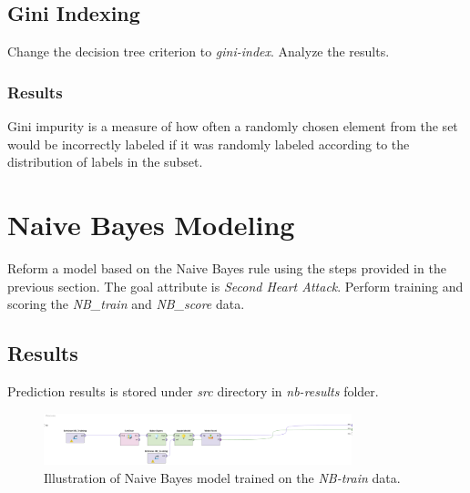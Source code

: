 \documentclass[12pt]{article}
\numberwithin{equation}{section}
\numberwithin{table}{section}
\numberwithin{figure}{section}
\begin{document}
\subsection*{Gini Indexing}
Change the decision tree criterion to \textit{gini-index}. Analyze the results.

\subsubsection*{Results}
Gini impurity is a measure of how often a randomly chosen element from the set would be incorrectly labeled if it was randomly labeled according to the distribution of labels in the subset.
\section{Naive Bayes Modeling}
Reform a model based on the Naive Bayes rule using the steps provided in the previous section. The goal attribute is \textit{Second Heart Attack}. Perform training and scoring the \textit{NB\_train} and \textit{NB\_score} data.
\subsection*{Results}
Prediction results is stored under \textit{src} directory in \textit{nb-results} folder.
\begin{figure}[!h]\centering
	\includegraphics[width=0.8\textwidth]{1_nb_1.png}
	\caption{Illustration of Naive Bayes model trained on the \textit{NB-train} data.}
	\label{pl1} 
\end{figure}
\end{document}
